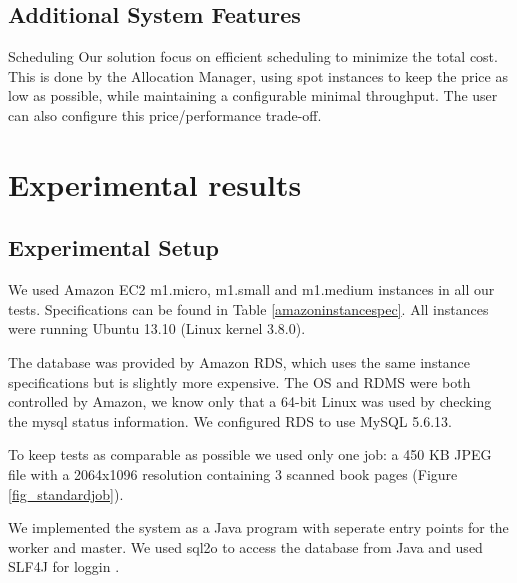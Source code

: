 \documentclass[a4paper]{IEEEtran}
\begin{document}
\subsection*{Additional System Features}

\begin{LaTeXdescription}
\item[Scheduling]
Our solution focus on efficient scheduling to minimize the total cost. This is done by the Allocation Manager, using spot instances to keep the price as low as possible, while maintaining a configurable minimal throughput.
The user can also configure this price/performance trade-off.

\end{LaTeXdescription}
\newpage
\section{Experimental results}
\label{sec:experimentalresults}

\subsection{Experimental Setup}

We used Amazon EC2 m1.micro, m1.small and m1.medium instances in all our tests. Specifications can be found in Table \ref{amazoninstancespec}. All instances were running Ubuntu 13.10 (Linux kernel 3.8.0).

The database was provided by Amazon RDS, which uses the same instance specifications but is slightly more expensive. The OS and RDMS were both controlled by Amazon, we know only that a 64-bit Linux was used by checking the mysql status information. We configured RDS to use MySQL 5.6.13.

To keep tests as comparable as possible we used only one job: a 450 KB JPEG file with a 2064x1096 resolution containing 3 scanned book pages (Figure \ref{fig_standardjob}).

We implemented the system as a Java program with seperate entry points for the worker and master. We used sql2o \cite{sql2ocite} to access the database from Java and used SLF4J for loggin \cite{slf4jcite}.
\end{document}

